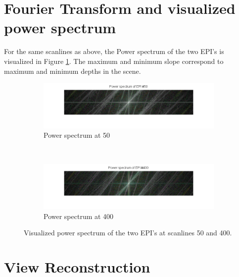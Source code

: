 \documentclass[a4paper]{article}
\begin{document}
\section*{Fourier Transform and visualized power spectrum}
For the same scanlines as above, the Power spectrum of the two EPI's is visualized in Figure \ref{fig:powerSpectrum}. The maximum and minimum slope correspond to maximum and minimum  depths in the scene.
\begin{figure}[ht]
	\vspace{2mm}
	\begin{subfigure}[h]{0.48\textwidth}
	  \includegraphics[width=\textwidth]{powerSpec50}
	  \caption*{Power spectrum at 50}
	\end{subfigure}
    	~
	\begin{subfigure}[h]{0.48\textwidth}
	  \centering
	  \includegraphics[width=\textwidth]{powerSpec400}
	  \caption*{Power spectrum at 400}
	\end{subfigure}
\caption{Visualized power spectrum of the two EPI's at scanlines 50 and 400.}
\label{fig:powerSpectrum}
\end{figure}

\section*{View Reconstruction}
\end{document}
